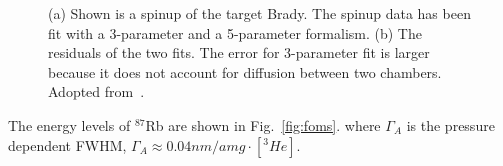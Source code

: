 \documentclass[pdftex,letterpaper,12pt]{report}
\begin{document}
\begin{figure}[H]
	\label{spinup}
	\centering
	\caption{{(a) Shown is a spinup of the target Brady. The spinup data has been fit with a 3-parameter and a 5-parameter formalism. (b) The residuals of the two fits. The error for 3-parameter fit is larger because it does not account for diffusion between two chambers. Adopted from~\cite{PhysRevC.91.055205}.}}
\end{figure}
	
The energy levels of $^{87}$Rb are shown in Fig.~\ref{fig:foms}.
where $\Gamma_{A}$ is the pressure dependent FWHM, $\Gamma_{A}\approx 0.04nm/amg \cdot [^{3}He]$.


\end{document}
